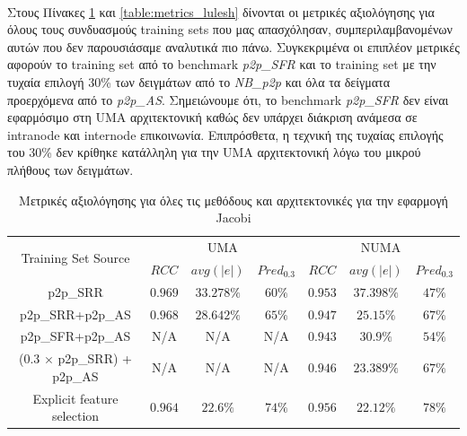 \paragraph{}
Στους Πίνακες \ref{table:metrics_jacobi} και \ref{table:metrics_lulesh} δίνονται οι μετρικές αξιολόγησης για όλους τους συνδυασμούς training sets που μας απασχόλησαν, συμπεριλαμβανομένων αυτών που δεν παρουσιάσαμε αναλυτικά πιο πάνω. Συγκεκριμένα οι επιπλέον μετρικές αφορούν το training set από το benchmark \textit{p2p\_SFR} και το training set με την τυχαία επιλογή 30\% των δειγμάτων από το \textit{ΝΒ\_p2p} και όλα τα δείγματα προερχόμενα από το \textit{p2p\_AS}. Σημειώνουμε ότι, το benchmark \textit{p2p\_SFR} δεν είναι εφαρμόσιμο στη UMA αρχιτεκτονική καθώς δεν υπάρχει διάκριση ανάμεσα σε intranode και internode επικοινωνία. Επιπρόσθετα, η τεχνική της τυχαίας επιλογής του 30\% δεν κρίθηκε κατάλληλη για την UMA αρχιτεκτονική λόγω του μικρού πλήθους των δειγμάτων.
\begin{table}[h]
\captionsetup{justification=centering,margin=0cm}

\centering
\footnotesize
\caption{Μετρικές αξιολόγησης για όλες τις μεθόδους και αρχιτεκτονικές για την εφαρμογή Jacobi}
\label{table:metrics_jacobi}
\begin{tabular}{c|ccc|ccc}
\multirow{2}{*}{Training Set Source} &   \multicolumn{3}{c}{UMA}    & \multicolumn{3}{c}{NUMA}            \\
         & $RCC$ & $avg(|e|)$ & $Pred_{0.3}$ & $RCC$ & $avg(|e|)$ & $Pred_{0.3}$  \\ \hline \hline
p2p\_SRR & $0.969$ & $33.278\%$ & $60\%$ & $ 0.953 $ & $ 37.398\% $ & $ 47\% $ \\
p2p\_SRR+p2p\_AS & $0.968$ & $28.642\%$ & $65\%$ & $ 0.947 $  & $ 25.15\% $ & $67\%$ \\                   
p2p\_SFR+p2p\_AS & N/A & N/A & N/A & $ 0.943 $ & $ 30.9\% $  & $54\%$ \\
(0.3 $\times$ p2p\_SRR) + p2p\_AS & N/A & N/A & N/A & $ 0.946 $  & $ 23.389\% $ & $ 67\%$ \\ 
Explicit feature selection & $ 0.964 $ & $ 22.6\% $ & $ 74\% $ & $ 0.956 $ & $ 22.12\% $ & $ 78\% $
\end{tabular}
\end{table}


